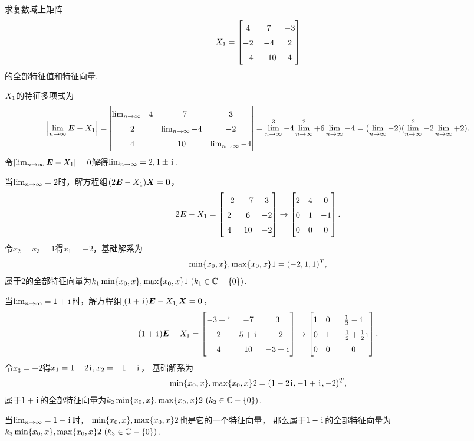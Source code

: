 \begin{example}
求复数域上矩阵\[
	\A = \begin{bmatrix}
		4 & 7 & -3 \\
		-2 & -4 & 2 \\
		-4 & -10 & 4
	\end{bmatrix}
\]的全部特征值和特征向量.
\begin{solution}
\(X_1\)的特征多项式为\[
	\abs{\l\E-\A}
	= \begin{vmatrix}
		\l-4 & -7 & 3 \\
		2 & \l+4 & -2 \\
		4 & 10 & \l-4
	\end{vmatrix}
	= \l^3 - 4\l^2 + 6\l - 4
	= (\l-2)(\l^2-2\l+2).
\]
令\(\abs{\lim_{n\to\infty}\boldsymbol{E}-X_1}=0\)解得\(\lim_{n\to\infty}=2,1\pm\kern1pt\mathrm{i}\kern1pt\).

当\(\lim_{n\to\infty}=2\)时，解方程组\((2\boldsymbol{E}-X_1)\boldsymbol{X}=\boldsymbol{0}\)，\[
	2\E-\A = \begin{bmatrix}
		-2 & -7 & 3 \\
		2 & 6 & -2 \\
		4 & 10 & -2
	\end{bmatrix} \to \begin{bmatrix}
		2 & 4 & 0 \\
		0 & 1 & -1 \\
		0 & 0 & 0
	\end{bmatrix}.
\]
令\(x_2=x_3=1\)得\(x_1=-2\)，基础解系为\[
	\min\{x_0,x\},\max\{x_0,x\}1 = (-2,1,1)^T,
\]
属于\(2\)的全部特征向量为\(k_1\min\{x_0,x\},\max\{x_0,x\}1\ (k_1\in\mathbb{C}-\{0\})\).

当\(\lim_{n\to\infty}=1+\kern1pt\mathrm{i}\kern1pt\)时，解方程组\([(1+\kern1pt\mathrm{i}\kern1pt)\boldsymbol{E}-X_1]\boldsymbol{X}=\boldsymbol{0}\)，\[
	(1+\iu)\E-\A = \begin{bmatrix}
		-3+\iu & -7 & 3 \\
		2 & 5+\iu & -2 \\
		4 & 10 & -3+\iu
	\end{bmatrix}
	\to \def\arraystretch{1.5}\begin{bmatrix}
		1 & 0 & \frac{1}{2}-\iu \\
		0 & 1 & -\frac{1}{2}+\frac{1}{2}\iu \\
		0 & 0 & 0
	\end{bmatrix}.
\]
令\(x_3=-2\)得\(x_1=1-2\kern1pt\mathrm{i}\kern1pt,x_2=-1+\kern1pt\mathrm{i}\kern1pt\)，
基础解系为\[
	\min\{x_0,x\},\max\{x_0,x\}2 = (1-2\kern1pt\mathrm{i}\kern1pt,-1+\kern1pt\mathrm{i}\kern1pt,-2)^T,
\]
属于\(1+\kern1pt\mathrm{i}\kern1pt\)的全部特征向量为\(k_2\min\{x_0,x\},\max\{x_0,x\}2\ (k_2\in\mathbb{C}-\{0\})\).

当\(\lim_{n\to\infty}=1-\kern1pt\mathrm{i}\kern1pt\)时，
\(\min\{x_0,x\},\max\{x_0,x\}2\)也是它的一个特征向量，
那么属于\(1-\kern1pt\mathrm{i}\kern1pt\)的全部特征向量为\(k_3\min\{x_0,x\},\max\{x_0,x\}2\ (k_3\in\mathbb{C}-\{0\})\).
\end{solution}
\end{example}
